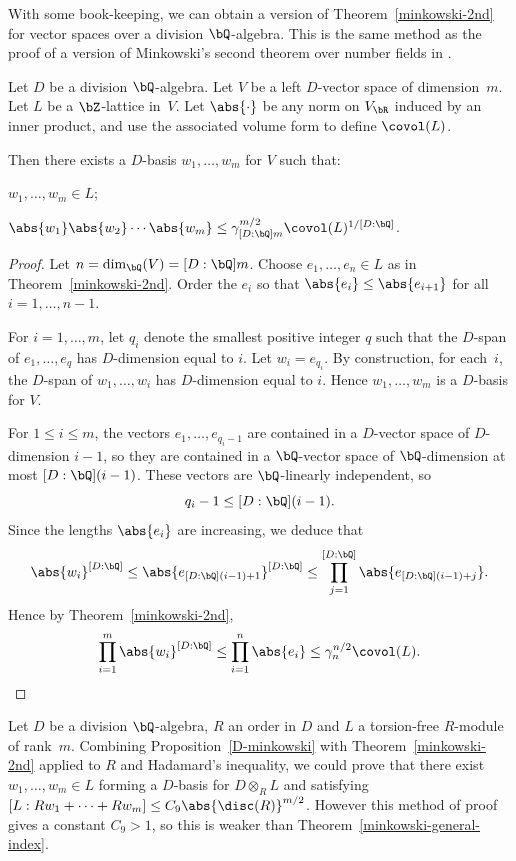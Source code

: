 With some book-keeping, we can obtain a version of Theorem~\ref{minkowski-2nd} for vector spaces over a division $\bQ$-algebra. This is the same method as the proof of a version of Minkowski's second theorem over number fields in \cite[C.2.18]{BG06}.

\begin{proposition} \label{D-minkowski}
Let $D$ be a division $\bQ$-algebra.
Let $V$ be a left $D$-vector space of dimension~$m$.
Let $L$ be a $\bZ$-lattice in~$V$.
Let $\abs{\cdot}$ be any norm on $V_\bR$ induced by an inner product, and use the associated volume form to define $\covol(L)$.

Then there exists a $D$-basis $w_1, \dotsc, w_m$ for $V$ such that:
\begin{enumeratei}
\item $w_1, \dotsc, w_m \in L$;
\item $\abs{w_1} \abs{w_2} \dotsm \abs{w_m} \leq \gamma_{[D:\bQ]m}^{m/2} \covol(L)^{1/[D:\bQ]}$.
\end{enumeratei}
\end{proposition}

\begin{proof}
Let $n = \dim_\bQ(V) = [D:\bQ]m$.
Choose $e_1, \dotsc, e_n \in L$ as in Theorem~\ref{minkowski-2nd}.
Order the $e_i$ so that $\abs{e_i} \leq \abs{e_{i+1}}$ for all $i = 1, \dotsc, n-1$.

For $i = 1, \dotsc, m$, let $q_i$ denote the smallest positive integer $q$ such that the $D$-span of $e_1, \dotsc, e_q$ has $D$-dimension equal to $i$.
Let $w_i = e_{q_i}$.
By construction, for each~$i$, the $D$-span of $w_1, \dotsc, w_i$ has $D$-dimension equal to $i$. Hence $w_1, \dotsc, w_m$ is a $D$-basis for $V$.

For $1 \leq i \leq m$, the vectors $e_1, \dotsc, e_{q_i-1}$ are contained in a $D$-vector space of $D$\nobreakdash-dimension $i-1$, so they are contained in a $\bQ$-vector space of $\bQ$-dimension at most $[D:\bQ](i-1)$. These vectors are $\bQ$-linearly independent, so
\[
q_i - 1 \leq [D:\bQ](i-1).
\]
Since the lengths $\abs{e_i}$ are increasing, we deduce that
\[
\abs{w_i}^{[D:\bQ]} \leq \abs{e_{[D:\bQ](i-1) + 1}}^{[D:\bQ]} \leq \prod_{j=1}^{[D:\bQ]} \abs{e_{[D:\bQ](i-1) + j}}.
\]
Hence by Theorem~\ref{minkowski-2nd},
\[
\prod_{i=1}^m \abs{w_i}^{[D:\bQ]} \leq \prod_{i=1}^n \abs{e_i} \leq \gamma_n^{n/2} \covol(L).
\qedhere
\]
\end{proof}

Let $D$ be a division $\bQ$-algebra, $R$ an order in $D$ and $L$ a torsion-free $R$-module of rank~$m$.
Combining Proposition~\ref{D-minkowski} with Theorem~\ref{minkowski-2nd} applied to $R$ and Hadamard's inequality, we could prove that there exist $w_1, \dotsc, w_m \in L$ forming a $D$-basis for $D \otimes_R L$ and satisfying $[L : Rw_1 + \dotsb + Rw_m] \leq C_{9} \abs{\disc(R)}^{m/2}$.
However this method of proof gives a constant $C_{9} > 1$, so this is weaker than Theorem~\ref{minkowski-general-index}.

